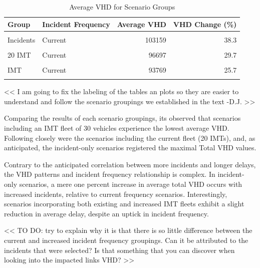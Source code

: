 \documentclass[fancy, oneside, mastersfancy, ms]{byuthesis}
\begin{document}
\hypertarget{tbl-network_delays_table}{}
\begin{table}
\caption{\label{tbl-network_delays_table}Average VHD for Scenario Groups }\tabularnewline

\centering
\begin{tabular}[t]{llrr}
\toprule
\textbf{Group} & \textbf{Incident Frequency} & \textbf{Average VHD} & \textbf{VHD Change (\%)}\\
\midrule
\cellcolor{gray!6}{Baseline} & \cellcolor{gray!6}{-} & \cellcolor{gray!6}{74568} & \cellcolor{gray!6}{0.0}\\
Incidents & Current & 103159 & 38.3\\
\cellcolor{gray!6}{Incidents} & \cellcolor{gray!6}{Increased} & \cellcolor{gray!6}{104178} & \cellcolor{gray!6}{39.7}\\
20 IMT & Current & 96697 & 29.7\\
\cellcolor{gray!6}{20 IMT} & \cellcolor{gray!6}{Increased} & \cellcolor{gray!6}{95678} & \cellcolor{gray!6}{28.3}\\
\addlinespace
30 IMT & Current & 93769 & 25.7\\
\cellcolor{gray!6}{30 IMT} & \cellcolor{gray!6}{Increased} & \cellcolor{gray!6}{93560} & \cellcolor{gray!6}{25.5}\\
\bottomrule
\end{tabular}
\end{table}

\textless\textless{} I am going to fix the labeling of the tables an
plots so they are easier to understand and follow the scenario groupings
we established in the text -D.J. \textgreater\textgreater{}

Comparing the results of each scenario groupings, its observed that
scenarios including an IMT fleet of 30 vehicles experience the lowest
average VHD. Following closely were the scenarios including the current
fleet (20 IMTs), and, as anticipated, the incident-only scenarios
registered the maximal Total VHD values.

Contrary to the anticipated correlation between more incidents and
longer delays, the VHD patterns and incident frequency relationship is
complex. In incident-only scenarios, a mere one percent increase in
average total VHD occurs with increased incidents, relative to current
frequency scenarios. Interestingly, scenarios incorporating both
existing and increased IMT fleets exhibit a slight reduction in average
delay, despite an uptick in incident frequency.

\textless\textless{} TO DO: try to explain why it is that there is so
little difference between the current and increased incident frequency
groupings. Can it be attributed to the incidents that were selected? Is
that something that you can discover when looking into the impacted
links VHD? \textgreater\textgreater{}
\end{document}
